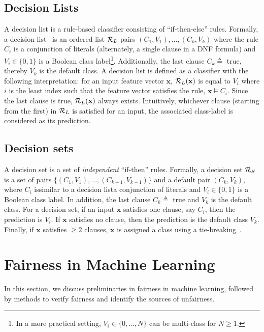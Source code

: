 \subsection{Decision Lists} A decision list is a rule-based classifier consisting of ``if-then-else'' rules. Formally, a decision list~\cite{rivest1987learning} is an ordered list $ {\mathcal{R}}_L $ pairs $ (C_1, V_1), \dots, (C_k, V_k) $ where the  rule $ C_i $ is a conjunction of literals (alternately, a single clause in a DNF formula) and $ V_i \in \{0,1\} $ is  a Boolean class label\footnote{In a more practical setting, $ V_i \in \{0, \dots, N\} $  can be multi-class for $ N \ge 1 $.}. Additionally, the last clause $ C_k \triangleq  $ true, thereby $ V_k $ is the default class. A decision list is defined as a classifier with the following interpretation: for an input feature vector $ \mathbf{x} $,  $ {\mathcal{R}}_L(\mathbf{x}) $ is equal to $ V_i $ where $ i $ is the least index such that the feature vector satisfies the rule, $ \mathbf{x} \models C_i $. Since the last clause is true, $ {\mathcal{R}}_L(\mathbf{x}) $ always exists. Intuitively, whichever clause (starting from the first) in $ {\mathcal{R}}_L $ is satisfied for an input, the associated class-label is considered as its prediction.

\subsection{Decision sets} A decision set is a set of \textit{independent} ``if-then'' rules. Formally,  a decision set $ {\mathcal{R}}_S $ is a set of pairs $ \{(C_1, V_1), \dots, (C_{k-1}, V_{k-1})\}  $ and a  default pair $ (C_k, V_k) $, where $ C_i $ is\textemdash similar to a decision list\textemdash a conjunction of literals and $ V_i \in \{0,1\} $ is a Boolean class label. In addition, the last clause $ C_k \triangleq  $ true and $ V_k $ is the default class. For a  decision set, if an input $ \mathbf{x} $ satisfies one clause, say $ C_i $, then the prediction is $ V_i $. If $ \mathbf{x} $ satisfies no clause, then the prediction is the default class $ V_k $. Finally, if $ \mathbf{x} $ satisfies  $ \ge 2 $ clauses, $ \mathbf{x} $ is assigned a class using a tie-breaking~\cite{lakkaraju2016interpretable}. 



\section{Fairness in Machine Learning}
\label{chapter_fairness_preliminaries}
In this section, we discuss preliminaries in fairness in machine learning, followed by methods to verify fairness and identify the sources of unfairness. 

